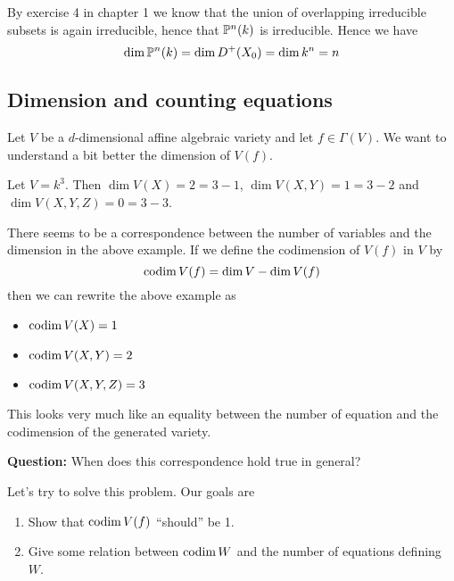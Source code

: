 \begin{example}[$\P^n(k)$]
By exercise 4 in chapter 1 we know that the union of overlapping irreducible subsets is again irreducible, hence that $\P^n(k)$ is irreducible. Hence we have 
\begin{equation*}
    \dim \P^n(k) = \dim D^+(X_0) = \dim k^n = n
\end{equation*}
\end{example}




\subsection{Dimension and counting equations}

Let $V$ be a $d$-dimensional affine algebraic variety and let $f\in \Gamma(V)$. We want to understand a bit better the dimension of $V(f)$. 

\begin{example}
Let $V=k^3$. Then $\dim V(X) = 2 = 3-1$, $\dim V(X, Y) = 1 = 3-2$ and $\dim V(X, Y, Z) = 0 = 3-3$.
\end{example}

There seems to be a correspondence between the number of variables and the dimension in the above example. If we define the codimension of $V(f)$ in $V$ by
\begin{equation*}
    \codim V(f) = \dim V - \dim V(f)
\end{equation*}
then we can rewrite the above example as 
\begin{itemize}
    \item $\codim V(X) = 1$
    \item $\codim V(X, Y) = 2$
    \item $\codim V(X, Y, Z) = 3$
\end{itemize}
This looks very much like an equality between the number of equation and the codimension of the generated variety. 


\textbf{Question:} When does this correspondence hold true in general? 

Let's try to solve this problem. Our goals are 
\begin{enumerate}
    \item Show that $\codim V(f)$ ``should'' be 1. 
    \item Give some relation between $\codim W$ and the number of equations defining $W$.
\end{enumerate}

